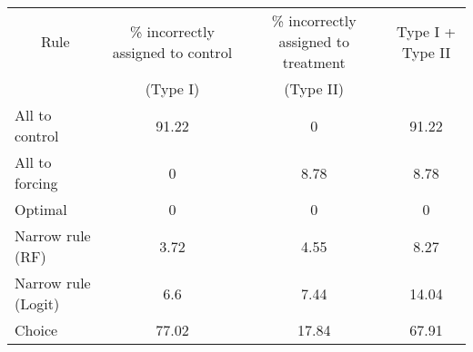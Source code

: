 \begin{tabular}{lccc}
\toprule
\multicolumn{1}{c}{Rule} & \% incorrectly assigned to control  & \% incorrectly assigned to treatment & Type I + Type II \\
      & (Type I) & (Type II) &  \\
\midrule
\midrule
All to control & 91.22 & 0     & 91.22 \\
All to forcing & 0     & 8.78  & 8.78 \\
Optimal & 0     & 0     & 0 \\
Narrow rule (RF) & 3.72  & 4.55  & 8.27 \\
Narrow rule (Logit) & 6.6   & 7.44  & 14.04 \\
Choice & 77.02 & 17.84 & 67.91 \\
\bottomrule
\bottomrule
\end{tabular}%
